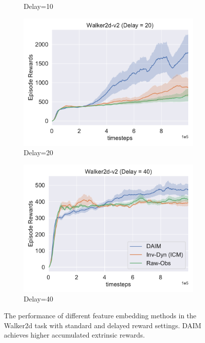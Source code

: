 \begin{figure}[h!]
\begin{subfigure}[t]{0.49\textwidth}
    \caption{Delay=10}
  \end{subfigure}\hfill
  \begin{subfigure}[t]{0.49\textwidth}
    \includegraphics[width=\textwidth]{figures/chapter5/embedding/delay20.pdf}
    \caption{Delay=20}
  \end{subfigure}\hfill
  \begin{subfigure}[t]{0.49\textwidth}
    \includegraphics[width=\textwidth]{figures/chapter5/embedding/delay40.pdf}
    \caption{Delay=40}
  \end{subfigure}\hfill
  \caption{The performance of different feature embedding methods in the Walker2d task with standard and delayed reward settings. DAIM achieves higher accumulated extrinsic rewards.} 
  \label{fig:walker2d_results}
\end{figure}
